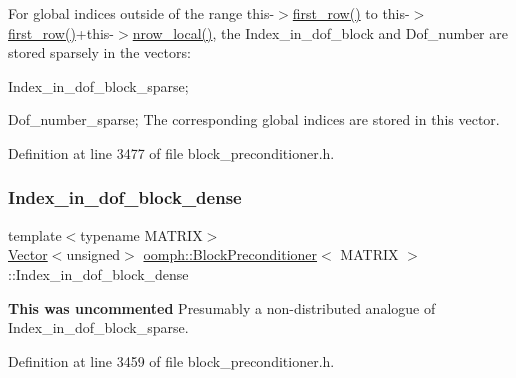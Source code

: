 For global indices outside of the range this-\/$>$\hyperlink{classoomph_1_1DistributableLinearAlgebraObject_ab00a3919b8634c698749f14a4d92947d}{first\+\_\+row()} to this-\/$>$\hyperlink{classoomph_1_1DistributableLinearAlgebraObject_ab00a3919b8634c698749f14a4d92947d}{first\+\_\+row()}+this-\/$>$\hyperlink{classoomph_1_1DistributableLinearAlgebraObject_a9bd7e1d242c69a28da85a804a7717fce}{nrow\+\_\+local()}, the Index\+\_\+in\+\_\+dof\+\_\+block and Dof\+\_\+number are stored sparsely in the vectors\+: 


\begin{DoxyItemize}
\item Index\+\_\+in\+\_\+dof\+\_\+block\+\_\+sparse;
\item Dof\+\_\+number\+\_\+sparse; The corresponding global indices are stored in this vector. 
\end{DoxyItemize}

Definition at line 3477 of file block\+\_\+preconditioner.\+h.

\mbox{\label{classoomph_1_1BlockPreconditioner_a0ad82070ce2f6cdfa9ea6c7226ea28af}} 
\subsubsection{\texorpdfstring{Index\+\_\+in\+\_\+dof\+\_\+block\+\_\+dense}{Index\_in\_dof\_block\_dense}}
{\footnotesize\ttfamily template$<$typename M\+A\+T\+R\+IX$>$ \\
\hyperlink{classoomph_1_1Vector}{Vector}$<$unsigned$>$ \hyperlink{classoomph_1_1BlockPreconditioner}{oomph\+::\+Block\+Preconditioner}$<$ M\+A\+T\+R\+IX $>$\+::Index\+\_\+in\+\_\+dof\+\_\+block\+\_\+dense\hspace{0.3cm}{\ttfamily [private]}}



{\bfseries This was uncommented} Presumably a non-\/distributed analogue of Index\+\_\+in\+\_\+dof\+\_\+block\+\_\+sparse. 



Definition at line 3459 of file block\+\_\+preconditioner.\+h.

\mbox{\label{classoomph_1_1BlockPreconditioner_a06bef26c782dacdc6b5caa6419df73c9}} 
